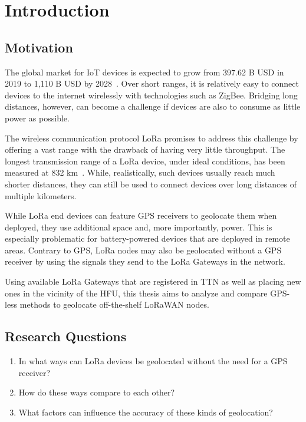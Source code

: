 \chapter{Introduction}

\section{Motivation}

The global market for \ac{IoT} devices is expected to grow from 397.62 B USD in 2019 to 1,110 B USD by 2028~\cite{grand_view_research_global_2022}.
Over short ranges, it is relatively easy to connect devices to the internet wirelessly with technologies such as ZigBee.
Bridging long distances, however, can become a challenge if devices are also to consume as little power as possible.

The wireless communication protocol \ac{LoRa} promises to address this challenge by offering a vast range with the drawback of having very little throughput.
The longest transmission range of a \ac{LoRa} device, under ideal conditions, has been measured at 832 km~\cite{the_things_network_global_team_lora_nodate}.
While, realistically, such devices usually reach much shorter distances, they can still be used to connect devices over long distances of multiple kilometers.

While \ac{LoRa} end devices can feature \ac{GPS} receivers to geolocate them when deployed, they use additional space and, more importantly, power.
This is especially problematic for battery-powered devices that are deployed in remote areas.
Contrary to \ac{GPS}, \ac{LoRa} nodes may also be geolocated without a \ac{GPS} receiver by using the signals they send to the \ac{LoRa} Gateways in the network.

Using available \ac{LoRa} Gateways that are registered in \acf{TTN} as well as placing new ones in the vicinity of the \acf{HFU}, this thesis aims to analyze and compare \ac{GPS}-less methods to geolocate off-the-shelf \ac{LoRaWAN} nodes.

\section{Research Questions}

\begin{enumerate}
      \item In what ways can \ac{LoRa} devices be geolocated without the need for a \ac{GPS} receiver?
      \item How do these ways compare to each other?
      \item What factors can influence the accuracy of these kinds of geolocation?
\end{enumerate}


